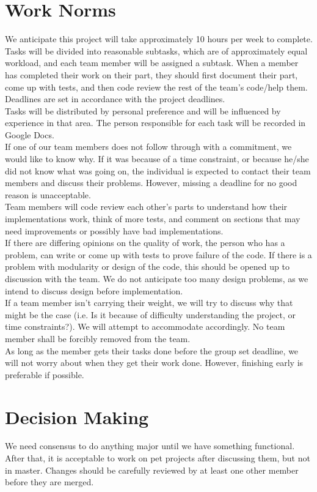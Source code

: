 \section{Work Norms}
We anticipate this project will take approximately 10 hours per week to complete.   
\newline
\\Tasks will be divided into reasonable subtasks, which are of approximately equal workload, and each team member will be assigned a subtask.  When a member has completed their work on their part, they should first document their part, come up with tests, and then code review the rest of the team's code/help them.  
\newline
\\Deadlines are set in accordance with the project deadlines. 
\newline
\\Tasks will be distributed by personal preference and will be influenced by experience in that area.  The person responsible for each task will be recorded in Google Docs.  
\newline
\\If one of our team members does not follow through with a commitment, we would like to know why.  If it was because of a time constraint, or because he/she did not know what was going on, the individual is expected to contact their team members and discuss their problems.  However, missing a deadline for no good reason is unacceptable. 
\newline
\\Team members will code review each other's parts to understand how their implementations work, think of more tests, and comment on sections that may need improvements or possibly have bad implementations.  
\newline
\\If there are differing opinions on the quality of work, the person who has a problem, can write or come up with tests to prove failure of the code.  If there is a problem with modularity or design of the code, this should be opened up to discussion with the team.  We do not anticipate too many design problems, as we intend to discuss design before implementation.  
\newline
\\If a team member isn't carrying their weight, we will try to discuss why that might be the case (i.e. Is it because of difficulty understanding the project, or time constraints?).  We will attempt to accommodate accordingly.  No team member shall be forcibly removed from the team.  
\newline
\\As long as the member gets their tasks done before the group set deadline, we will not worry about when they get their work done.  However, finishing early is preferable if possible.  
\section{Decision Making}

We need consensus to do anything major until we have something functional. After that, it is acceptable to work on pet projects after discussing them, but not in master. Changes should be carefully reviewed by at least one other member before they are merged.



